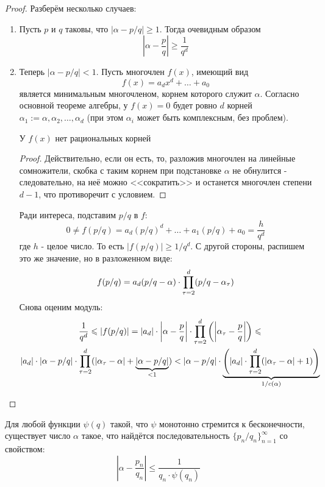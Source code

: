 \begin{proof}
	Разберём несколько случаев:
	\begin{enumerate}
		\item Пусть $p$ и $q$ таковы, что $|\alpha - p/q| \ge 1$. Тогда очевидным образом
		\[
			\left|\alpha - \frac{p}{q}\right| \ge \frac{1}{q^d}
		\]
		
		\item Теперь $|\alpha - p/q| < 1$. Пусть многочлен $f(x)$, имеющий вид
		\[
			f(x) = a_d x^d + \ldots + a_0
		\]
		является минимальным многочленом, корнем которого служит $\alpha$. Согласно основной теореме алгебры, у $f(x) = 0$ будет ровно $d$ корней $\alpha_1 := \alpha, \alpha_2, \ldots, \alpha_d$ (при этом $\alpha_i$ может быть комплексным, без проблем).
		\begin{proposition}
			У $f(x)$ нет рациональных корней
		\end{proposition}
		
		\begin{proof}
			Действительно, если он есть, то, разложив многочлен на линейные сомножители, скобка с таким корнем при подстановке $\alpha$ не обнулится - следовательно, на неё можно <<сократить>> и останется многочлен степени $d - 1$, что противоречит с условием.
		\end{proof}
	
		Ради интереса, подставим $p/q$ в $f$:
		\[
			0 \neq f(p/q) = a_d (p/q)^d + \ldots + a_1 (p/q) + a_0 = \frac{h}{q^d}
		\]
		где $h$ - целое число. То есть $|f(p/q)| \ge 1/q^d$. С другой стороны, распишем это же значение, но в разложенном виде:
		\[
			f(p/q) = a_d (p/q - \alpha) \cdot \prod\limits_{\tau = 2}^d (p/q - \alpha_\tau)
		\]
		Снова оценим модуль:
		\begin{multline*}
			\frac{1}{q^d} \leqslant |f(p/q)| = |a_d| \cdot \left|\alpha - \frac{p}{q}\right| \cdot \prod\limits_{\tau = 2}^d \left(\left|\alpha_\tau - \frac{p}{q}\right|\right) \leqslant
			\\
			|a_d| \cdot |\alpha - p/q| \cdot \prod\limits_{\tau = 2}^d (|\alpha_\tau - \alpha| + \underbrace{|\alpha - p/q|}_{< 1}) < |\alpha - p/q| \cdot \underbrace{\left(|a_d| \cdot \prod\limits_{\tau = 2}^d (|\alpha_\tau - \alpha| + 1)\right)}_{1/c(\alpha)}
		\end{multline*}
	\end{enumerate}
\end{proof}

\begin{theorem}
	Для любой функции $\psi(q)$ такой, что $\psi$ монотонно стремится к бесконечности, существует число $\alpha$ такое, что найдётся последовательность $\{p_n/q_n\}_{n = 1}^\infty$ со свойством:
	\[
		\left|\alpha -  \frac{p_n}{q_n}\right| \le \frac{1}{q_n \cdot \psi(q_n)}
	\]
\end{theorem}

